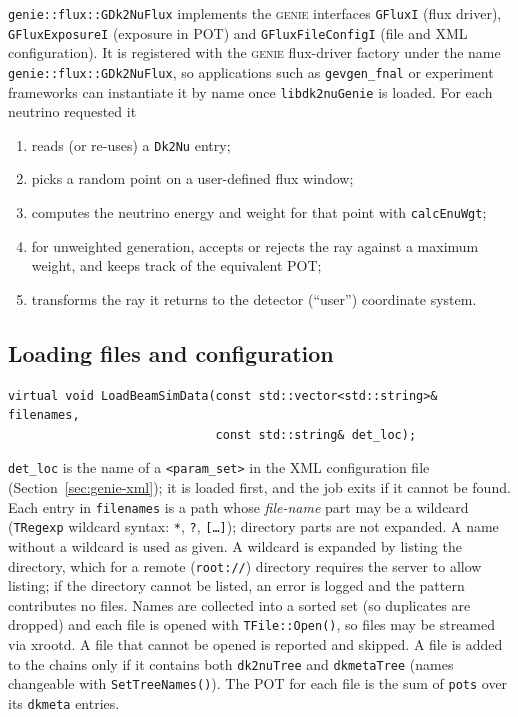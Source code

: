 \documentclass[11pt]{article}
\newcommand{\code}[1]{\texttt{#1}}
\newcommand{\genie}{\textsc{genie}\xspace}
\newcommand{\sect}[1]{Section~\ref{sec:#1}}
\begin{document}
\code{genie::flux::GDk2NuFlux} implements the \genie interfaces
\code{GFluxI} (flux driver), \code{GFluxExposureI} (exposure in POT) and
\code{GFluxFileConfigI} (file and XML configuration).  It is registered
with the \genie flux-driver factory under the name
\code{genie::flux::GDk2NuFlux}, so applications such as
\code{gevgen\_fnal} or experiment frameworks can instantiate it by name
once \code{libdk2nuGenie} is loaded.  For each neutrino requested it
\begin{enumerate}[nosep]
\item reads (or re-uses) a \code{Dk2Nu} entry;
\item picks a random point on a user-defined flux window;
\item computes the neutrino energy and weight for that point with
      \code{calcEnuWgt};
\item for unweighted generation, accepts or rejects the ray against a
      maximum weight, and keeps track of the equivalent POT;
\item transforms the ray it returns to the detector (``user'') coordinate
      system.
\end{enumerate}

\subsection{Loading files and configuration}\label{sec:genie-load}

\begin{lstlisting}[style=cxx,numbers=none]
virtual void LoadBeamSimData(const std::vector<std::string>& filenames,
                             const std::string& det_loc);
\end{lstlisting}
\code{det\_loc} is the name of a \code{<param\_set>} in the XML
configuration file (\sect{genie-xml}); it is loaded first, and the job
exits if it cannot be found.  Each entry in \code{filenames} is a path
whose \emph{file-name} part may be a wildcard (\code{TRegexp} wildcard
syntax: \code{*}, \code{?}, \code{[\ldots]}); directory parts are not
expanded.  A name without a wildcard is used as given.  A wildcard is
expanded by listing the directory, which for a remote (\code{root://})
directory requires the server to allow listing; if the directory cannot be
listed, an error is logged and the pattern contributes no files.  Names are
collected into a sorted set (so duplicates are dropped) and each file is
opened with \code{TFile::Open()}, so files may be streamed via xrootd.  A
file that cannot be opened is reported and skipped.  A file is added to the
chains only if it contains both \code{dk2nuTree} and \code{dkmetaTree}
(names changeable with \code{SetTreeNames()}).  The POT for each file is
the sum of \code{pots} over its \code{dkmeta} entries.
\end{document}
